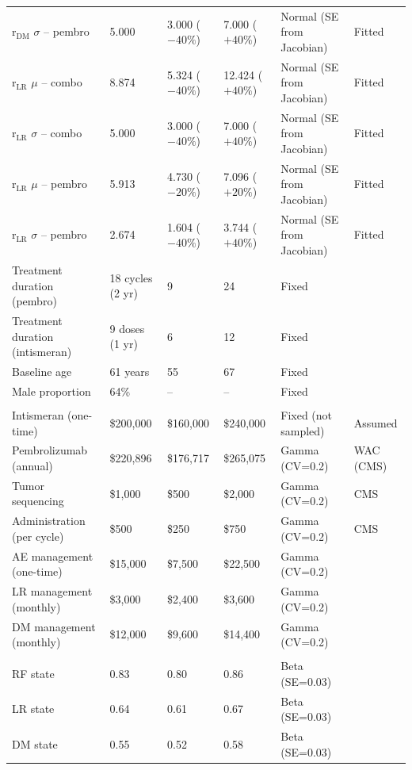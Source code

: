 \documentclass[11pt,a4paper]{article}
\begin{document}
\begin{landscape}
\begin{table}[p]
\begin{tabularx}{\linewidth}{@{}>{\raggedright\arraybackslash}Xlll>{\raggedright\arraybackslash}Xl@{}}
r$_{\text{DM}}$ $\sigma$ -- pembro & 5.000 & 3.000 ($-40\%$) & 7.000 ($+40\%$) & Normal (SE from Jacobian) & Fitted \\
r$_{\text{LR}}$ $\mu$ -- combo & 8.874 & 5.324 ($-40\%$) & 12.424 ($+40\%$) & Normal (SE from Jacobian) & Fitted \\
r$_{\text{LR}}$ $\sigma$ -- combo & 5.000 & 3.000 ($-40\%$) & 7.000 ($+40\%$) & Normal (SE from Jacobian) & Fitted \\
r$_{\text{LR}}$ $\mu$ -- pembro & 5.913 & 4.730 ($-20\%$) & 7.096 ($+20\%$) & Normal (SE from Jacobian) & Fitted \\
r$_{\text{LR}}$ $\sigma$ -- pembro & 2.674 & 1.604 ($-40\%$) & 3.744 ($+40\%$) & Normal (SE from Jacobian) & Fitted \\
Treatment duration (pembro) & 18 cycles (2 yr) & 9 & 24 & Fixed & \cite{khattak2026} \\
Treatment duration (intismeran) & 9 doses (1 yr) & 6 & 12 & Fixed & \cite{khattak2026} \\
Baseline age & 61 years & 55 & 67 & Fixed & \cite{khattak2026} \\
Male proportion & 64\% & -- & -- & Fixed & \cite{khattak2026} \\
\midrule
\multicolumn{6}{c}{\textit{Costs (2026 USD)}} \\
Intismeran (one-time) & \$200,000 & \$160,000 & \$240,000 & Fixed (not sampled) & Assumed \\
Pembrolizumab (annual) & \$220,896 & \$176,717 & \$265,075 & Gamma (CV=0.2) & WAC (CMS) \\
Tumor sequencing & \$1,000 & \$500 & \$2,000 & Gamma (CV=0.2) & CMS \\
Administration (per cycle) & \$500 & \$250 & \$750 & Gamma (CV=0.2) & CMS \\
AE management (one-time) & \$15,000 & \$7,500 & \$22,500 & Gamma (CV=0.2) & \cite{zhang2023} \\
LR management (monthly) & \$3,000 & \$2,400 & \$3,600 & Gamma (CV=0.2) & \cite{zhang2023} \\
DM management (monthly) & \$12,000 & \$9,600 & \$14,400 & Gamma (CV=0.2) & \cite{bensimon2019} \\
\midrule
\multicolumn{6}{c}{\textit{Utilities}} \\
RF state & 0.83 & 0.80 & 0.86 & Beta (SE=0.03) & \cite{johnston2021} \\
LR state & 0.64 & 0.61 & 0.67 & Beta (SE=0.03) & \cite{johnston2021} \\
DM state & 0.55 & 0.52 & 0.58 & Beta (SE=0.03) & \cite{johnston2021} \\

\end{tabularx}
\end{table}
\end{landscape}
\end{document}
